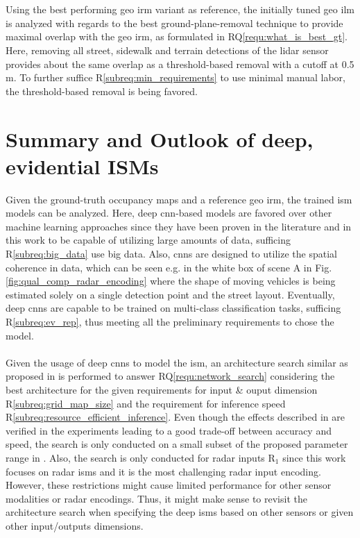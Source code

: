 \\\\
Using the best performing geo \gls{irm} variant as reference, the initially tuned geo \gls{ilm} is analyzed with regards to the best ground-plane-removal technique to provide maximal overlap with the geo \gls{irm}, as formulated in RQ\ref{requ:what_is_best_gt}. Here, removing all street, sidewalk and terrain detections of the lidar sensor provides about the same overlap as a threshold-based removal with a cutoff at 0.5 m. To further suffice R\ref{subreq:min_requirements} to use minimal manual labor, the threshold-based removal is being favored.
%
\section{Summary and Outlook of deep, evidential ISMs}
\label{sec:disc_deep_ev_isms}
Given the ground-truth occupancy maps and a reference geo \gls{irm}, the trained \gls{ism} models can be analyzed. Here, deep \gls{cnn}-based models are favored over other machine learning approaches since they have been proven in the literature and in this work to be capable of utilizing large amounts of data, sufficing R\ref{subreq:big_data} use big data. Also, \gls{cnn}s are designed to utilize the spatial coherence in data, which can be seen e.g. in the white box of scene A in Fig. \ref{fig:qual_comp_radar_encoding} where the shape of moving vehicles is being estimated solely on a single detection point and the street layout. Eventually, deep \gls{cnn}s are capable to be trained on multi-class classification tasks, sufficing R\ref{subreq:ev_rep}, thus meeting all the preliminary requirements to chose the model.
\\\\
Given the usage of deep \gls{cnn}s to model the \gls{ism}, an architecture search similar as proposed in \cite{radosavovic2020designing} is performed to answer RQ\ref{requ:network_search} considering the best architecture for the given requirements for input \& ouput dimension R\ref{subreq:grid_map_size} and the requirement for inference speed R\ref{subreq:resource_efficient_inference}. Even though the effects described in \cite{radosavovic2020designing} are verified in the experiments leading to a good trade-off between accuracy and speed, the search is only conducted on a small subset of the proposed parameter range in \cite{radosavovic2020designing}. Also, the search is only conducted for radar inputs R$_1$ since this work focuses on radar \gls{ism}s and it is the most challenging radar input encoding. However, these restrictions might cause limited performance for other sensor modalities or radar encodings. Thus, it might make sense to revisit the architecture search when specifying the deep \gls{ism}s based on other sensors or given other input/outputs dimensions.
